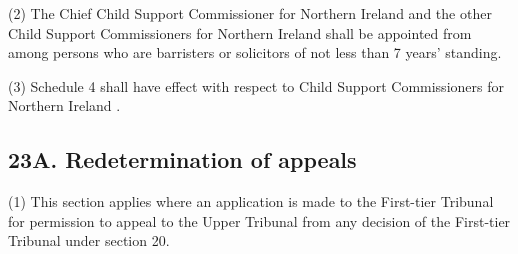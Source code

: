 \documentclass[12pt,a4paper]{article}
\begin{document}
(2) The Chief Child Support Commissioner for Northern Ireland and the other Child Support Commissioners for Northern Ireland shall be appointed from among persons who are barristers or solicitors of not less than 
7  %
years' standing.

(3) Schedule 4 shall have effect with respect to Child Support Commissioners for Northern Ireland%
.

%


\subsection{23A. Redetermination of appeals}

(1) This section applies where an application is made 
to the First-tier Tribunal for permission to appeal to the Upper Tribunal from any decision of the First-tier Tribunal under section 20.  %
\end{document}
